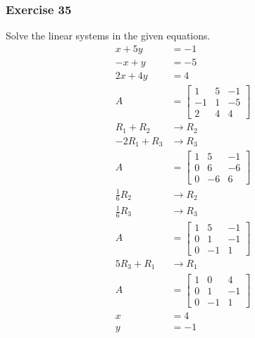 \documentclass{math}
\begin{document}
\subsubsection*{Exercise 35}
Solve the linear systems in the given equations.
\begin{align*}
  x+5y &= -1 \\
  -x+y &= -5 \\
  2x+4y &= 4 \\
  A &= \left[\begin{array}{cc|c}
    1 & 5 & -1 \\
    -1 & 1 & -5 \\
    2 & 4 & 4
  \end{array}\right] \\
  R_1+R_2 &\to R_2 \\
  -2R_1+R_3 &\to R_3 \\
  A &= \left[\begin{array}{cc|c}
    1 & 5 & -1 \\
    0 & 6 & -6 \\
    0 & -6 & 6
  \end{array}\right] \\
  \frac{1}{6}R_2 &\to R_2 \\
  \frac{1}{6}R_3 &\to R_3 \\
  A &= \left[\begin{array}{cc|c}
    1 & 5 & -1 \\
    0 & 1 & -1 \\
    0 & -1 & 1
  \end{array}\right] \\
  5R_3+R_1 &\to R_1 \\
  A &= \left[\begin{array}{cc|c}
    1 & 0 & 4 \\
    0 & 1 & -1 \\
    0 & -1 & 1
  \end{array}\right] \\
  x &= 4 \\
  y &= -1
\end{align*}
\end{document}
